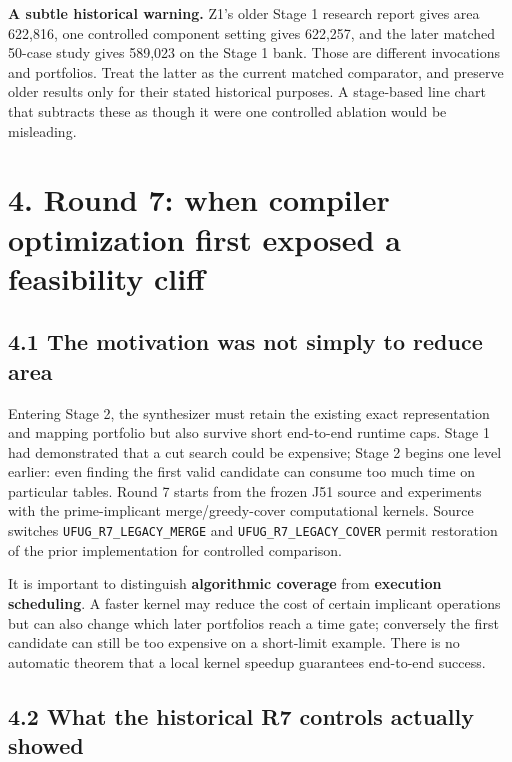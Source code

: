 \documentclass[a4paper,10pt]{article}
\theoremstyle{definition}
\theoremstyle{remark}
\begin{document}
\textbf{A subtle historical warning.} Z1's older Stage 1 research report gives area 622,816, one controlled component setting gives 622,257, and the later matched 50-case study gives 589,023 on the Stage 1 bank. Those are different invocations and portfolios. Treat the latter as the current matched comparator, and preserve older results only for their stated historical purposes. A stage-based line chart that subtracts these as though it were one controlled ablation would be misleading.

\section{4. Round 7: when compiler optimization first exposed a feasibility cliff}\label{round-7-when-compiler-optimization-first-exposed-a-feasibility-cliff}

\subsection{4.1 The motivation was not simply to reduce area}\label{the-motivation-was-not-simply-to-reduce-area}

Entering Stage 2, the synthesizer must retain the existing exact representation and mapping portfolio but also survive short end-to-end runtime caps. Stage 1 had demonstrated that a cut search could be expensive; Stage 2 begins one level earlier: even finding the first valid candidate can consume too much time on particular tables. Round 7 starts from the frozen J51 source and experiments with the prime-implicant merge/greedy-cover computational kernels. Source switches \texttt{UFUG\_R7\_LEGACY\_MERGE} and \texttt{UFUG\_R7\_LEGACY\_COVER} permit restoration of the prior implementation for controlled comparison.

It is important to distinguish \textbf{algorithmic coverage} from \textbf{execution scheduling}. A faster kernel may reduce the cost of certain implicant operations but can also change which later portfolios reach a time gate; conversely the first candidate can still be too expensive on a short-limit example. There is no automatic theorem that a local kernel speedup guarantees end-to-end success.

\subsection{4.2 What the historical R7 controls actually showed}\label{what-the-historical-r7-controls-actually-showed}
\end{document}
